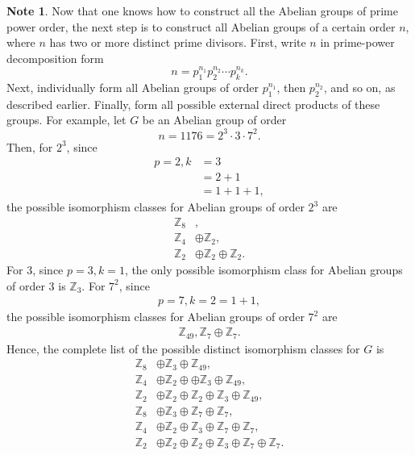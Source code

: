 \documentclass{article}
\theoremstyle{definition}
\newtheorem{note}{Note}[section]
\begin{document}
\begin{note}
        Now that one knows how to construct all the Abelian groups of prime power order, the next step is to construct all Abelian groups of a certain order $n$, where $n$ has two or more distinct prime divisors. First, write $n$ in prime-power decomposition form
        \begin{equation*}
            n=p_1^{n_1}p_2^{n_2}\cdots p_k^{n_k}.
        \end{equation*}
        Next, individually form all Abelian groups of order $p_1^{n_1}$, then $p_2^{n_2}$, and so on, as described earlier. Finally, form all possible external direct products of these groups. For example, let $G$ be an Abelian group of order
        \begin{equation*}
            n=1176=2^3\cdot3\cdot7^2.
        \end{equation*}
        Then, for $2^3$, since
        \begin{align*}
            p=2,k&=3\\
            &=2+1\\
            &=1+1+1,
        \end{align*}
        the possible isomorphism classes for Abelian groups of order $2^3$ are
        \begin{align*}
            \mathbb{Z}_8 &,\\
            \mathbb{Z}_4 &\oplus\mathbb{Z}_2,\\
            \mathbb{Z}_2 &\oplus\mathbb{Z}_2\oplus\mathbb{Z}_2.
        \end{align*}
        For 3, since $p=3,k=1$, the only possible isomorphism class for Abelian groups of order 3 is $\mathbb{Z}_3$. For $7^2$, since
        \begin{align*}
            p=7,k=2=1+1,
        \end{align*}
        the possible isomorphism classes for Abelian groups of order $7^2$ are
        \begin{align*}
            \mathbb{Z}_{49}, \mathbb{Z}_7\oplus\mathbb{Z}_7.
        \end{align*}
        Hence, the complete list of the possible distinct isomorphism classes for $G$ is
        \begin{align*}
            \mathbb{Z}_8 &\oplus \mathbb{Z}_3 \oplus \mathbb{Z}_{49}, \\
            \mathbb{Z}_4 &\oplus \mathbb{Z}_2 \oplus \oplus \mathbb{Z}_3 \oplus \mathbb{Z}_{49}, \\
            \mathbb{Z}_2 &\oplus \mathbb{Z}_2 \oplus\mathbb{Z}_2\oplus\mathbb{Z}_3\oplus \mathbb{Z}_{49}, \\
            \mathbb{Z}_8 &\oplus \mathbb{Z}_3 \oplus\mathbb{Z}_7\oplus\mathbb{Z}_7, \\
            \mathbb{Z}_4 &\oplus \mathbb{Z}_2 \oplus \mathbb{Z}_3\oplus\mathbb{Z}_7\oplus\mathbb{Z}_7, \\
            \mathbb{Z}_2 &\oplus \mathbb{Z}_2 \oplus \mathbb{Z}_2\oplus\mathbb{Z}_3\oplus\mathbb{Z}_7\oplus\mathbb{Z}_7. \\
        \end{align*}
        

\end{note}
\end{document}
